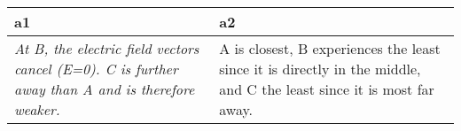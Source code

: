 \centering
\caption{
              Student explanations from \textbf{xxxxxxx}, 
              for the question prompt: ``Rank the magnitudes of the electric 
              field at point A, B and C shown in the following figure from 
              greatest magnitude to weakest magnitude''. 
              }
\begin{tabular}{p{6cm}|p{6cm}}
\toprule
                                                                                               a1 &                                                                                                                    a2 \\
\midrule
\textit{ At B, the electric field vectors cancel (E=0). C is further away than 
A and is therefore weaker.} &  A is closest, B experiences the least since it 
is directly in the middle, and C the least since it is most far away. \\
\bottomrule
\end{tabular}

